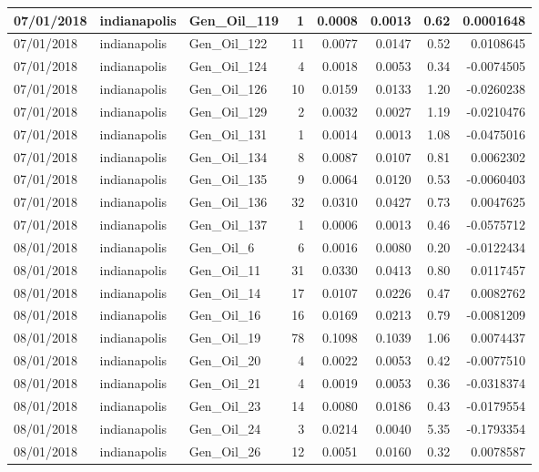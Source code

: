 \documentclass[
  letterpaper,
  DIV=11,
  numbers=noendperiod]{scrartcl}
\begin{document}
\begin{tabular}{l|l|l|r|r|r|r|r}
\hline
07/01/2018 & indianapolis & Gen\_Oil\_119 & 1 & 0.0008 & 0.0013 & 0.62 & 0.0001648\\
\hline
07/01/2018 & indianapolis & Gen\_Oil\_122 & 11 & 0.0077 & 0.0147 & 0.52 & 0.0108645\\
\hline
07/01/2018 & indianapolis & Gen\_Oil\_124 & 4 & 0.0018 & 0.0053 & 0.34 & -0.0074505\\
\hline
07/01/2018 & indianapolis & Gen\_Oil\_126 & 10 & 0.0159 & 0.0133 & 1.20 & -0.0260238\\
\hline
07/01/2018 & indianapolis & Gen\_Oil\_129 & 2 & 0.0032 & 0.0027 & 1.19 & -0.0210476\\
\hline
07/01/2018 & indianapolis & Gen\_Oil\_131 & 1 & 0.0014 & 0.0013 & 1.08 & -0.0475016\\
\hline
07/01/2018 & indianapolis & Gen\_Oil\_134 & 8 & 0.0087 & 0.0107 & 0.81 & 0.0062302\\
\hline
07/01/2018 & indianapolis & Gen\_Oil\_135 & 9 & 0.0064 & 0.0120 & 0.53 & -0.0060403\\
\hline
07/01/2018 & indianapolis & Gen\_Oil\_136 & 32 & 0.0310 & 0.0427 & 0.73 & 0.0047625\\
\hline
07/01/2018 & indianapolis & Gen\_Oil\_137 & 1 & 0.0006 & 0.0013 & 0.46 & -0.0575712\\
\hline
08/01/2018 & indianapolis & Gen\_Oil\_6 & 6 & 0.0016 & 0.0080 & 0.20 & -0.0122434\\
\hline
08/01/2018 & indianapolis & Gen\_Oil\_11 & 31 & 0.0330 & 0.0413 & 0.80 & 0.0117457\\
\hline
08/01/2018 & indianapolis & Gen\_Oil\_14 & 17 & 0.0107 & 0.0226 & 0.47 & 0.0082762\\
\hline
08/01/2018 & indianapolis & Gen\_Oil\_16 & 16 & 0.0169 & 0.0213 & 0.79 & -0.0081209\\
\hline
08/01/2018 & indianapolis & Gen\_Oil\_19 & 78 & 0.1098 & 0.1039 & 1.06 & 0.0074437\\
\hline
08/01/2018 & indianapolis & Gen\_Oil\_20 & 4 & 0.0022 & 0.0053 & 0.42 & -0.0077510\\
\hline
08/01/2018 & indianapolis & Gen\_Oil\_21 & 4 & 0.0019 & 0.0053 & 0.36 & -0.0318374\\
\hline
08/01/2018 & indianapolis & Gen\_Oil\_23 & 14 & 0.0080 & 0.0186 & 0.43 & -0.0179554\\
\hline
08/01/2018 & indianapolis & Gen\_Oil\_24 & 3 & 0.0214 & 0.0040 & 5.35 & -0.1793354\\
\hline
08/01/2018 & indianapolis & Gen\_Oil\_26 & 12 & 0.0051 & 0.0160 & 0.32 & 0.0078587\\

\end{tabular}
\end{document}
